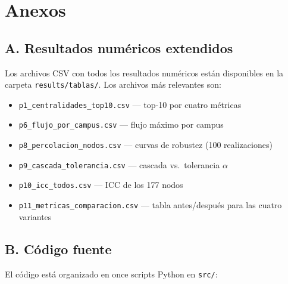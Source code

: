 \documentclass[11pt, a4paper]{article}
\newcommand{\code}[1]{\texttt{\small #1}}
\begin{document}
\section*{Anexos}

\subsection*{A. Resultados numéricos extendidos}

Los archivos CSV con todos los resultados numéricos están disponibles en la
carpeta \code{results/tablas/}. Los archivos más relevantes son:

\begin{itemize}
    \item \code{p1\_centralidades\_top10.csv} --- top-10 por cuatro métricas
    \item \code{p6\_flujo\_por\_campus.csv} --- flujo máximo por campus
    \item \code{p8\_percolacion\_nodos.csv} --- curvas de robustez (100
          realizaciones)
    \item \code{p9\_cascada\_tolerancia.csv} --- cascada vs.\ tolerancia
          $\alpha$
    \item \code{p10\_icc\_todos.csv} --- ICC de los 177 nodos
    \item \code{p11\_metricas\_comparacion.csv} --- tabla antes/después para
          las cuatro variantes
\end{itemize}

\subsection*{B. Código fuente}

El código está organizado en once scripts Python en \code{src/}:
\end{document}
